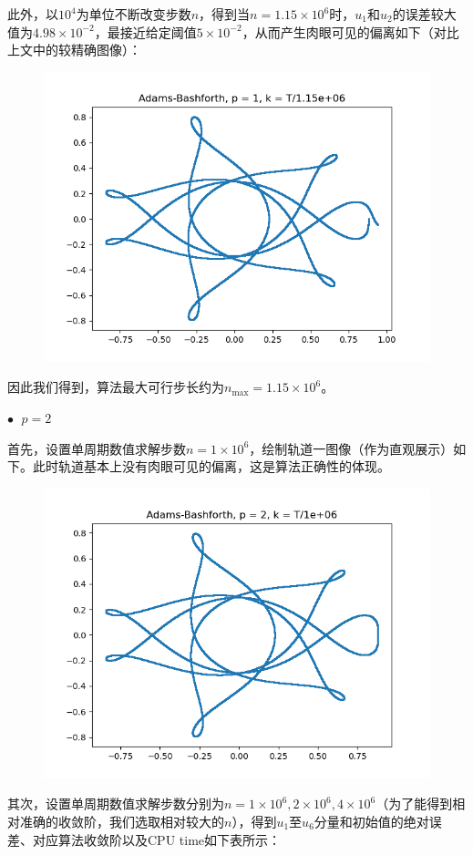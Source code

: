 \documentclass{ctexart}
\begin{document}
\begin{sloppypar}
此外，以$10^4$为单位不断改变步数$n$，得到当$n = 1.15 \times 10^6$时，$u_1$和$u_2$的误差较大值为$4.98 \times 10^{-2}$，最接近给定阈值$5 \times 10^{-2}$，从而产生肉眼可见的偏离如下（对比上文中的较精确图像）：
\begin{figure}[H]
\centering
\includegraphics[scale = 0.45]{./report_src/Figure_41.png}
\end{figure}
因此我们得到，算法最大可行步长约为$n_{\max} = 1.15 \times 10^6$。

$\bullet \;$ $p = 2$

首先，设置单周期数值求解步数$n = 1 \times 10^6$，绘制轨道一图像（作为直观展示）如下。此时轨道基本上没有肉眼可见的偏离，这是算法正确性的体现。
\begin{figure}[H]
\centering
\includegraphics[scale = 0.45]{./report_src/Figure_42.png}
\end{figure}
其次，设置单周期数值求解步数分别为$n = 1 \times 10^6,2 \times 10^6,4 \times 10^6$（为了能得到相对准确的收敛阶，我们选取相对较大的$n$），得到$u_1$至$u_6$分量和初始值的绝对误差、对应算法收敛阶以及CPU time如下表所示：


\end{sloppypar}
\end{document}
